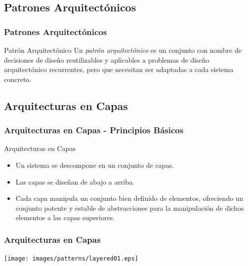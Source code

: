 \documentclass[a4paper,t,xcolor=pst,dvips,colortheme]{beamer}
\begin{document}
\subsection{Patrones Arquitectónicos}

\begin{frame}[c]
	\frametitle{Patrones Arquitectónicos}
    \begin{block}{Patrón Arquitectónico}
        Un \emph{patrón arquitectónico} es un conjunto con nombre de decisiones de diseño reutilizables y aplicables a problemas de diseño arquitectónico recurrentes, pero que necesitan ser adaptadas a cada sistema concreto.
	\end{block}
\end{frame}

\subsection{Arquitecturas en Capas}

\begin{frame}[c]
    \frametitle{Arquitecturas en Capas - Principios Básicos}
    \begin{block}{Arquitecturas en Capas}
        \begin{itemize}[<+->]
            \item Un sistema se descompone en un conjunto de capas.
            \item Las capas se diseñan de abajo a arriba.
            \item Cada capa manipula un conjunto bien definido de elementos, ofreciendo un \alert{conjunto potente y estable de abstracciones} para la manipulación de dichos elementos a las capas superiores.
        \end{itemize}
    \end{block}
\end{frame}


\begin{frame}[c]
	\frametitle{Arquitecturas en Capas}
	\begin{center}
        \texttt{[image: images/patterns/layered01.eps]}
	\end{center}
\end{frame}
\end{document}
